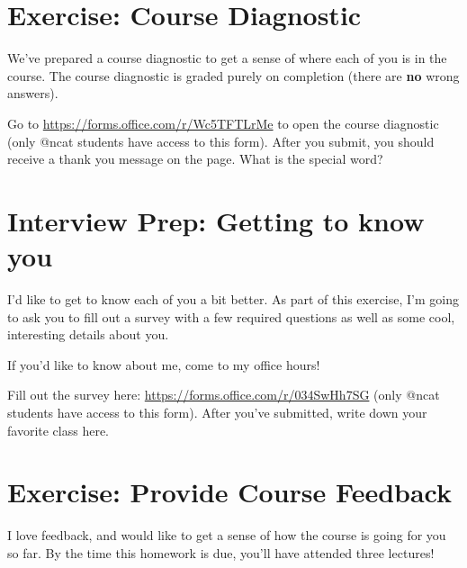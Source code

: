\documentclass [12pt]{article}
\begin{document}
 
\section {Exercise: Course Diagnostic} 
 We've prepared a course diagnostic to get a sense of where each of you is in the course. The course diagnostic is graded purely on completion (there are \textbf{no} wrong answers). 

Go to \href{https://forms.office.com/r/Wc5TFTLrMe}{https://forms.office.com/r/Wc5TFTLrMe} to open the course diagnostic (only @ncat students have access to this form). After you submit, you should receive a thank you message on the page. What is the special word?


\pagebreak
\section{Interview Prep: Getting to know you}
 I'd like to get to know each of you a bit better. As part of this exercise, I'm going to ask you to fill out a survey with a few required questions as well as some cool, interesting details about you. 

If you'd like to know about me, come to my office hours!

Fill out the survey here: \href{https://forms.office.com/r/034SwHh7SG}{https://forms.office.com/r/034SwHh7SG} (only @ncat students have access to this form). After you've submitted, write down your favorite class here.


\section{Exercise: Provide Course Feedback}
 I love feedback, and would like to get a sense of how the course is going for you so far. By the time this homework is due, you'll have attended three lectures!
\end{document}
